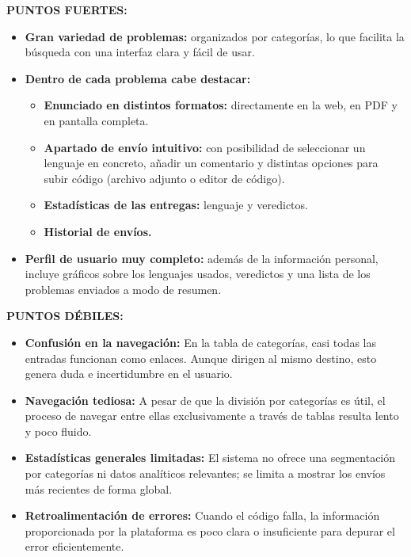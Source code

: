 \textbf{PUNTOS FUERTES:}
\begin{itemize}
    \item \textbf{Gran variedad de problemas:} organizados por categorías, lo que facilita la búsqueda con una interfaz clara y fácil de usar.
    
    \item \textbf{Dentro de cada problema cabe destacar:}
    \begin{itemize}
        \item \textbf{Enunciado en distintos formatos:} directamente en la web, en PDF y en pantalla completa.
        \item \textbf{Apartado de envío intuitivo:} con posibilidad de seleccionar un lenguaje en concreto, añadir un comentario y distintas opciones para subir código (archivo adjunto o editor de código).
        \item \textbf{Estadísticas de las entregas:} lenguaje y veredictos.
        \item \textbf{Historial de envíos.}
    \end{itemize}
    
    \item \textbf{Perfil de usuario muy completo:} además de la información personal, incluye gráficos sobre los lenguajes usados, veredictos y una lista de los problemas enviados a modo de resumen.
\end{itemize}

\textbf{PUNTOS DÉBILES:}
\begin{itemize}
    \item \textbf{Confusión en la navegación:} En la tabla de categorías, casi todas las entradas funcionan como enlaces. Aunque dirigen al mismo destino, esto genera duda e incertidumbre en el usuario.
    
    \item \textbf{Navegación tediosa:} A pesar de que la división por categorías es útil, el proceso de navegar entre ellas exclusivamente a través de tablas resulta lento y poco fluido.
    
    \item \textbf{Estadísticas generales limitadas:} El sistema no ofrece una segmentación por categorías ni datos analíticos relevantes; se limita a mostrar los envíos más recientes de forma global.
    
    \item \textbf{Retroalimentación de errores:} Cuando el código falla, la información proporcionada por la plataforma es poco clara o insuficiente para depurar el error eficientemente.
\end{itemize}


